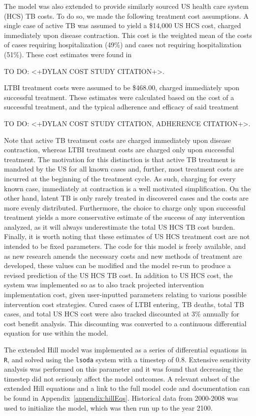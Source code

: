 \documentclass{amsart}
\renewcommand{\(}{\left(}
\renewcommand{\)}{\right)}
\newcommand{\TODO}[1]{\begin{framed}{\huge \color{red} TO DO:}
  #1 \end{framed}}
\begin{document}
The model was also extended to provide similarly sourced US health care system
(HCS) TB costs. To do so, we made the following treatment cost assumptions. A
single case of active TB was assumed to yield a \$14,000 US HCS cost, charged
immediately upon disease contraction. This cost is the weighted mean of the
costs of cases requiring hospitalization (49\%) and cases not requiring
hospitalization (51\%).  These cost estimates were found in \TODO{<+DYLAN COST
STUDY CITATION+>.} LTBI treatment costs were assumed to be \$468.00, charged
immediately upon successful treatment. These estimates were calculated based on
the cost of a successful treatment, and the typical adherence and efficacy of
said treatment \TODO{<+DYLAN COST STUDY CITATION, ADHERENCE CITATION+>.} Note
that active TB treatment costs are charged immediately upon disease contraction,
whereas LTBI treatment costs are charged only upon successful treatment. The
motivation for this distinction is that active TB treatment is mandated by the
US for all known cases and, further, most treatment costs are incurred at the
beginning of the treatment cycle. As such, charging for every known case,
immediately at contraction is a well motivated simplification. On the other
hand, latent TB is only rarely treated in discovered cases and the costs are
more evenly distributed. Furthermore, the choice to charge only upon successful
treatment yields a more conservative estimate of the success of any intervention
analyzed, as it will always underestimate the total US HCS TB cost burden.
Finally, it is worth noting that these estimates of US HCS treatment cost are
not intended to be fixed parameters. The code for this model is freely
available, and as new research amends the necessary costs and new methods of
treatment are developed, these values can be modified and the model re-run to
produce a revised prediction of the US HCS TB cost. In addition to US HCS cost,
the system was implemented so as to also track projected intervention
implementation cost, given user-inputted parameters relating to various possible
intervention cost strategies.  Cured cases of LTBI entering, TB deaths, total TB
cases, and total US HCS cost were also tracked discounted at 3\% annually for
cost benefit analysis. This discounting was converted to a continuous
differential equation for use within the model. 
 
The extended Hill model was implemented as a series of differential equations in
\texttt{R}, and solved using the \texttt{lsoda} system with a timestep of $0.8$.
Extensive sensitivity analysis was performed on this parameter and it was found
that decreasing the timestep did not seriously affect the model outcomes.  A
relevant subset of the extended Hill equations and a link to the full model code
and documentation can be found in Appendix~\ref{appendix:hillEqs}. Historical
data from 2000-2008 was used to initialize the model, which was then run up to
the year 2100.  
\end{document}
